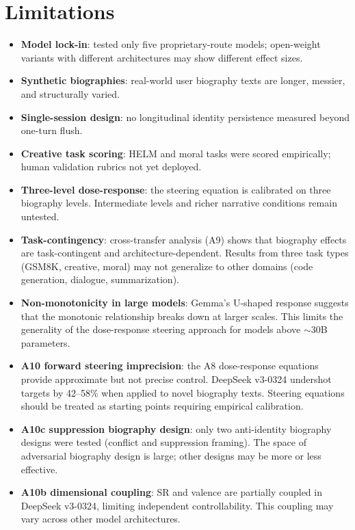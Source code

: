 \documentclass[11pt,a4paper]{article}
\begin{document}
\section{Limitations}
\label{sec:limitations}

\begin{itemize}[nosep]
\item \textbf{Model lock-in}: tested only five proprietary-route models; open-weight variants with different architectures may show different effect sizes.
\item \textbf{Synthetic biographies}: real-world user biography texts are longer, messier, and structurally varied.
\item \textbf{Single-session design}: no longitudinal identity persistence measured beyond one-turn flush.
\item \textbf{Creative task scoring}: HELM and moral tasks were scored empirically; human validation rubrics not yet deployed.
\item \textbf{Three-level dose-response}: the steering equation is calibrated on three biography levels. Intermediate levels and richer narrative conditions remain untested.
\item \textbf{Task-contingency}: cross-transfer analysis (A9) shows that biography effects are task-contingent and architecture-dependent. Results from three task types (GSM8K, creative, moral) may not generalize to other domains (code generation, dialogue, summarization).
\item \textbf{Non-monotonicity in large models}: Gemma's U-shaped response suggests that the monotonic relationship breaks down at larger scales. This limits the generality of the dose-response steering approach for models above $\sim$30B parameters.
\item \textbf{A10 forward steering imprecision}: the A8 dose-response equations provide approximate but not precise control. DeepSeek v3-0324 undershot targets by 42--58\% when applied to novel biography texts. Steering equations should be treated as starting points requiring empirical calibration.
\item \textbf{A10c suppression biography design}: only two anti-identity biography designs were tested (conflict and suppression framing). The space of adversarial biography design is large; other designs may be more or less effective.
\item \textbf{A10b dimensional coupling}: SR and valence are partially coupled in DeepSeek v3-0324, limiting independent controllability. This coupling may vary across other model architectures.
\end{itemize}
\end{document}

